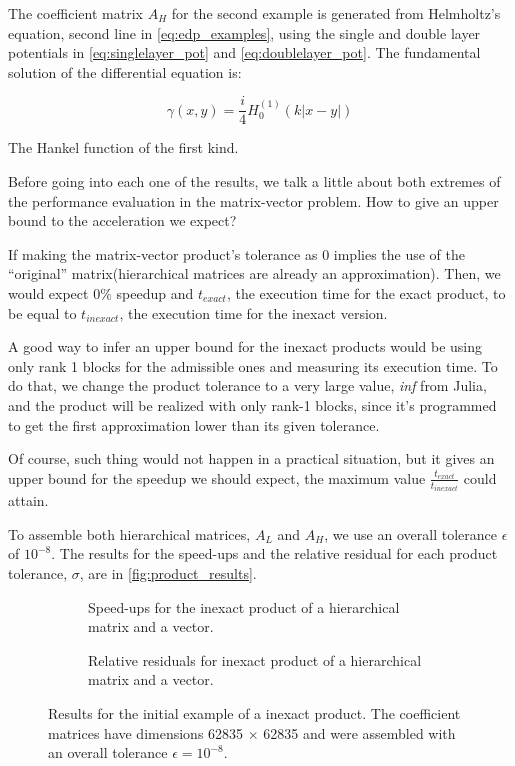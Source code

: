 The coefficient matrix $A_{H}$ for the second example is generated from Helmholtz's equation, second line in \autoref{eq:edp_examples}, using the single and double layer potentials in \autoref{eq:singlelayer_pot} and \autoref{eq:doublelayer_pot}. The fundamental solution of the differential equation is:

\begin{equation}
    \gamma(x,y) = \frac{i}{4} H_{0}^{(1)}(k|x-y|)
\end{equation}

The Hankel function of the first kind.

Before going into each one of the results, we talk a little about both extremes of the performance evaluation in the matrix-vector problem. How to give an upper bound to the acceleration we expect?

If making the matrix-vector product's tolerance as 0 implies the use of the “original”   matrix(hierarchical matrices are already an approximation). Then, we would expect 0$\%$ speedup and $t_{exact}$, the execution time for the exact product, to be equal to $t_{inexact}$, the execution time for the inexact version.

A good way to infer an upper bound for the inexact products would be using only rank 1 blocks for the admissible ones and measuring its execution time. To do that, we change the product tolerance to a very large value, \textit{inf} from Julia, and the product will be realized with only rank-1 blocks, since it's programmed to get the first approximation lower than its given tolerance.

Of course, such thing would not happen in a practical situation, but it gives an upper bound for the speedup we should expect, the maximum value $\frac{t_{exact}}{t_{inexact}}$ could attain.

To assemble both hierarchical matrices, $A_{L}$ and $A_{H}$, we use an overall tolerance $\epsilon$ of $10^{-8}$. The results for the speed-ups and the relative residual for each product tolerance, $\sigma$, are in \autoref{fig:product_results}.

\begin{figure}[h!]
    \centering
    \begin{subfigure}[b]{0.45\linewidth}
        
        \caption{Speed-ups for the inexact product of a hierarchical matrix and a vector.}
    \end{subfigure}
    \begin{subfigure}[b]{0.45\linewidth}
        
        \caption{Relative residuals for inexact product of a hierarchical matrix and a vector.}
    \end{subfigure}
    \caption{Results for the initial example of a inexact product. The coefficient matrices have dimensions 62835 $\times$ 62835 and were assembled with an overall tolerance $\epsilon = 10^{-8}$.}
    \label{fig:product_results}
\end{figure}

